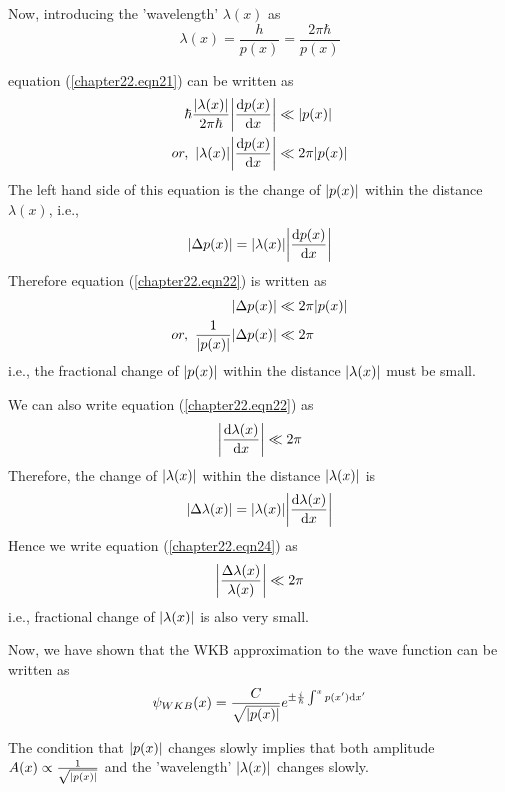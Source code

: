 Now, introducing the 'wavelength' $\lambda(x)$ as 
\begin{equation}
\lambda(x) = \frac{h}{p(x)} = \frac{2\pi \hbar}{p(x)}
\end{equation}

equation (\ref{chapter22.eqn21}) can be written as
\begin{align}
\hbar \frac{\abs{\lambda(x)}}{2 \pi \hbar} \abs{\dv{p(x)}{x}} &\ll \abs{p(x)} \nonumber \\
\label{chapter22.eqn22}
or, \ \abs{\lambda(x)} \abs{\dv{p(x)}{x}} &\ll 2 \pi \abs{p(x)}
\end{align}
The left hand side of this equation is the change of $\abs{p(x)}$ within the distance $\lambda(x)$, i.e.,
\begin{equation*}
\abs{\Delta p(x)} = \abs{\lambda(x)} \abs{\dv{p(x)}{x}}
\end{equation*}
Therefore equation (\ref{chapter22.eqn22}) is written as
\begin{align}
	\abs{\Delta p(x)} &\ll 2\pi \abs{p(x)} \nonumber \\
	\label{chapter22.eqn23}
	or, \ \frac{1}{\abs{p(x)}} \abs{\Delta p(x)} &\ll 2 \pi
\end{align}
i.e., the fractional change of $\abs{p(x)}$ within the distance $\abs{\lambda(x)}$ must be small.

We can also write equation (\ref{chapter22.eqn22}) as
\begin{equation}
\label{chapter22.eqn24}
\abs{\dv{\lambda(x)}{x}} \ll 2 \pi
\end{equation}
Therefore, the change of $\abs{\lambda(x)}$ within the distance $\abs{\lambda(x)}$ is
\begin{equation}
\abs{\Delta \lambda(x)} = \abs{\lambda(x)} \abs{\dv{\lambda(x)}{x}}
\end{equation}
Hence we write equation (\ref{chapter22.eqn24}) as
\begin{equation}
	\label{chapter22.eqn25}
	\abs{\frac{\Delta \lambda(x)}{\lambda(x)}} \ll 2 \pi
\end{equation}
i.e., fractional change of $\abs{\lambda(x)}$ is also very small.

Now, we have shown that the WKB approximation to the wave function can be written as
\begin{equation}
\psi_{WKB}(x) = \frac{C}{\sqrt{\abs{p(x)}}} e^{\pm \frac{{i\mkern1mu}}{\hbar} \int^{x} p(x^\prime) \dd{x^\prime}}
\end{equation}

The condition that $\abs{p(x)}$ changes slowly implies that both amplitude $A(x) \propto \frac{1}{\sqrt{\abs{p(x)}}}$ and the 'wavelength'  $\abs{\lambda(x)}$ changes slowly.




